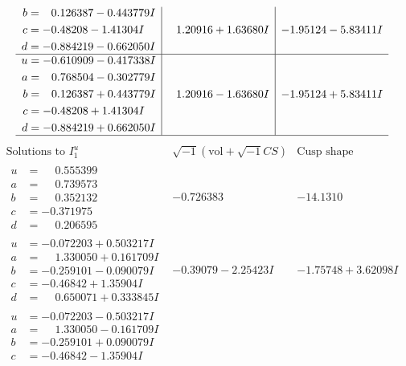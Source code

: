 \documentclass[1p]{elsarticle_modified}
\theoremstyle{definition}
\newcommand{\I}{\sqrt{-1}}
\begin{document}
$$\begin{array}{c|c|c}
\begin{aligned}
b &= \phantom{-}0.126387 - 0.443779 I \\
c &= -0.48208 - 1.41304 I \\
d &= -0.884219 - 0.662050 I\end{aligned}
 & \phantom{-}1.20916 + 1.63680 I & -1.95124 - 5.83411 I \\ \hline\begin{aligned}
u &= -0.610909 - 0.417338 I \\
a &= \phantom{-}0.768504 - 0.302779 I \\
b &= \phantom{-}0.126387 + 0.443779 I \\
c &= -0.48208 + 1.41304 I \\
d &= -0.884219 + 0.662050 I\end{aligned}
 & \phantom{-}1.20916 - 1.63680 I & -1.95124 + 5.83411 I\\
 \hline 
 \end{array}$$\newpage$$\begin{array}{c|c|c}  
\text{Solutions to }I^u_{1}& \I (\text{vol} + \sqrt{-1}CS) & \text{Cusp shape}\\
 \hline 
\begin{aligned}
u &= \phantom{-}0.555399\phantom{ +0.000000I} \\
a &= \phantom{-}0.739573\phantom{ +0.000000I} \\
b &= \phantom{-}0.352132\phantom{ +0.000000I} \\
c &= -0.371975\phantom{ +0.000000I} \\
d &= \phantom{-}0.206595\phantom{ +0.000000I}\end{aligned}
 & -0.726383\phantom{ +0.000000I} & -14.1310\phantom{ +0.000000I} \\ \hline\begin{aligned}
u &= -0.072203 + 0.503217 I \\
a &= \phantom{-}1.330050 + 0.161709 I \\
b &= -0.259101 - 0.090079 I \\
c &= -0.46842 + 1.35904 I \\
d &= \phantom{-}0.650071 + 0.333845 I\end{aligned}
 & -0.39079 - 2.25423 I & -1.75748 + 3.62098 I \\ \hline\begin{aligned}
u &= -0.072203 - 0.503217 I \\
a &= \phantom{-}1.330050 - 0.161709 I \\
b &= -0.259101 + 0.090079 I \\
c &= -0.46842 - 1.35904 I \\

\end{aligned}
\end{array}$$
\end{document}
